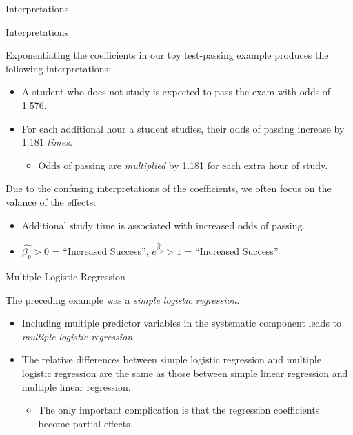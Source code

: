 \documentclass{beamer}\usepackage[]{graphicx}\usepackage[]{color}
\begin{document}
{\begin{frame}{Interpretations}
\end{frame}


\begin{frame}[allowframebreaks]{Interpretations}
  
  Exponentiating the coefficients in our toy test-passing example produces the 
  following interpretations:
  \vb
  \begin{itemize}
  \item A student who does not study is expected to pass the exam with odds of 
    1.576.
    \vc
  \item For each additional hour a student studies, their odds of passing
    increase by 1.181 \emph{times}.
    \vc
    \begin{itemize}
    \item Odds of passing are \emph{multiplied} by 1.181 for each extra 
      hour of study.
    \end{itemize}
  \end{itemize}
    
  \pagebreak
  
  Due to the confusing interpretations of the coefficients, we often focus
  on the valance of the effects: 
  \vb
  \begin{itemize}
  \item Additional study time is associated with increased odds of passing.
    \vc
  \item $\hat{\beta_p} > 0$ = ``Increased Success'',  $e^{\hat{\beta}_p} > 1$ = 
    ``Increased Success''
  \end{itemize}
\end{frame}

}%
\begin{frame}{Multiple Logistic Regression}
  
  The preceding example was a \emph{simple logistic regression}.
  \vb
  \begin{itemize}
  \item Including multiple predictor variables in the systematic component leads 
    to \emph{multiple logistic regression}.
    \vb
  \item The relative differences between simple logistic regression and multiple
    logistic regression are the same as those between simple linear regression
    and multiple linear regression.
    \vc
    \begin{itemize}
    \item The only important complication is that the regression coefficients 
      become partial effects.
    \end{itemize}
  \end{itemize}
  
\end{frame}
  
\end{document}
